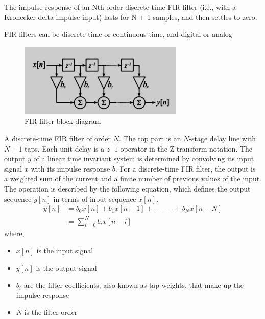 \documentclass[conference]{IEEEtran}
\begin{document}
The impulse response of an Nth-order discrete-time FIR filter (i.e., with a Kronecker delta impulse input) lasts for N + 1 samples, and then settles to zero.

FIR filters can be discrete-time or continuous-time, and digital or analog
\begin{figure}[!h]
	\begin{center} 
	    \includegraphics[width=\columnwidth]{figs/FIR}
	\end{center}
\caption{FIR filter block diagram}
\label{fig:Fig1}
\end{figure}

A discrete-time FIR filter of order $N$. The top part is an $N$-stage delay line with $N+1$ taps. Each unit delay is a $z^-1$ operator in the Z-transform notation. The output $y$ of a linear time invariant system is determined by convolving its input signal $x$ with its impulse response $b$. For a discrete-time FIR filter, the output is a weighted sum of the current and a finite number of previous values of the input. The operation is described by the following equation, which defines the output sequence $y[n]$ in terms of input sequence $x[n]$.
\begin{align}
y[n] &= b_0x[n]+b_1x[n-1]+---+b_Nx[n-N]\\
 	 &= \sum_{i=0}^{N}b_ix[n-i] 
\end{align} 
where,
\begin{itemize}
\item $x[n]$ is the input signal
\item $y[n]$ is the output signal
\item $b_i$ are the filter coefficients, also known as tap weights, that make up the impulse response
\item $N$ is the filter order
\end{itemize}
\end{document}
